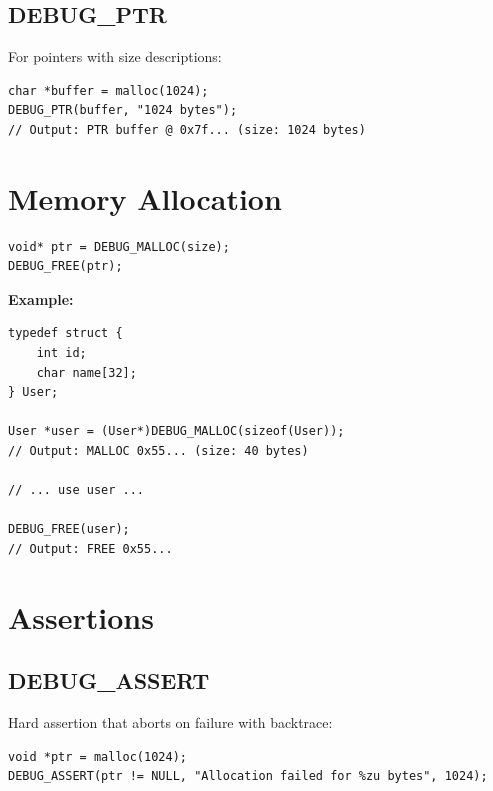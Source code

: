 \documentclass[11pt,a4paper]{article}
\begin{document}
\subsection{DEBUG\_PTR}

For pointers with size descriptions:

\begin{lstlisting}
char *buffer = malloc(1024);
DEBUG_PTR(buffer, "1024 bytes");
// Output: PTR buffer @ 0x7f... (size: 1024 bytes)
\end{lstlisting}

\section{Memory Allocation}

\begin{tcolorbox}[title=Memory Macros]
\begin{lstlisting}[numbers=none]
void* ptr = DEBUG_MALLOC(size);
DEBUG_FREE(ptr);
\end{lstlisting}
\end{tcolorbox}

\textbf{Example:}
\begin{lstlisting}
typedef struct {
    int id;
    char name[32];
} User;

User *user = (User*)DEBUG_MALLOC(sizeof(User));
// Output: MALLOC 0x55... (size: 40 bytes)

// ... use user ...

DEBUG_FREE(user);
// Output: FREE 0x55...
\end{lstlisting}

\section{Assertions}

\subsection{DEBUG\_ASSERT}

Hard assertion that aborts on failure with backtrace:

\begin{lstlisting}
void *ptr = malloc(1024);
DEBUG_ASSERT(ptr != NULL, "Allocation failed for %zu bytes", 1024);
\end{lstlisting}
\end{document}

